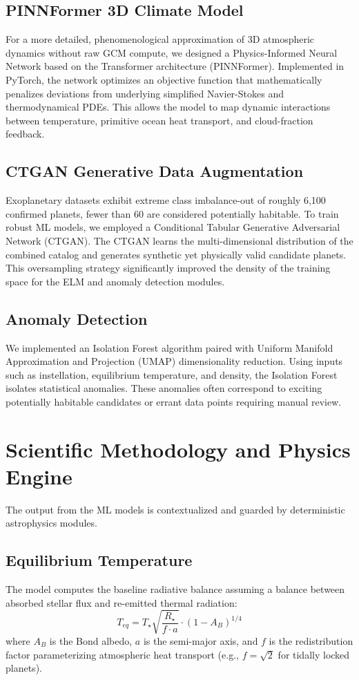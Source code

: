 \documentclass[12pt,a4paper]{article}
\begin{document}
\subsection{PINNFormer 3D Climate Model}
For a more detailed, phenomenological approximation of 3D atmospheric dynamics without raw GCM compute, we designed a Physics-Informed Neural Network based on the Transformer architecture (PINNFormer). Implemented in PyTorch, the network optimizes an objective function that mathematically penalizes deviations from underlying simplified Navier-Stokes and thermodynamical PDEs. This allows the model to map dynamic interactions between temperature, primitive ocean heat transport, and cloud-fraction feedback.

\subsection{CTGAN Generative Data Augmentation}
Exoplanetary datasets exhibit extreme class imbalance-out of roughly 6,100 confirmed planets, fewer than 60 are considered potentially habitable. To train robust ML models, we employed a Conditional Tabular Generative Adversarial Network (CTGAN). The CTGAN learns the multi-dimensional distribution of the combined catalog and generates synthetic yet physically valid candidate planets. This oversampling strategy significantly improved the density of the training space for the ELM and anomaly detection modules.

\subsection{Anomaly Detection}
We implemented an Isolation Forest algorithm paired with Uniform Manifold Approximation and Projection (UMAP) dimensionality reduction. Using inputs such as instellation, equilibrium temperature, and density, the Isolation Forest isolates statistical anomalies. These anomalies often correspond to exciting potentially habitable candidates or errant data points requiring manual review.

\section{Scientific Methodology and Physics Engine}
The output from the ML models is contextualized and guarded by deterministic astrophysics modules. 

\subsection{Equilibrium Temperature}
The model computes the baseline radiative balance assuming a balance between absorbed stellar flux and re-emitted thermal radiation:
\begin{equation}
T_{eq} = T_\star \sqrt{\frac{R_\star}{f \cdot a}} \cdot (1 - A_B)^{1/4}
\end{equation}
where $A_B$ is the Bond albedo, $a$ is the semi-major axis, and $f$ is the redistribution factor parameterizing atmospheric heat transport (e.g., $f=\sqrt{2}$ for tidally locked planets).
\end{document}
